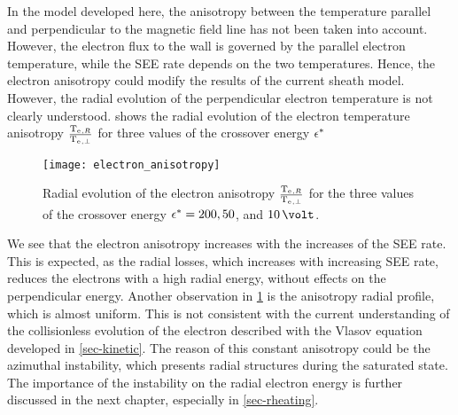 \vspace{1ex}
In the model developed here, the anisotropy between the temperature parallel and perpendicular to the magnetic field line has not been taken into account.
However, the electron flux to the wall is governed by the parallel electron temperature, while the \ac{SEE} rate depends on the two temperatures.
Hence, the electron anisotropy could modify the results of the current sheath model.
However, the radial evolution of the perpendicular electron temperature is not clearly understood.
 shows the radial evolution of the electron temperature anisotropy  $\frac{\mathrm{T_e}{}_{, R}}{\mathrm{T_e}{}_{, \perp}}$ for three values of the crossover energy $\epsilon^{*}$

\begin{figure}[!ht]
  \centering
  \texttt{[image: electron\_anisotropy]}
  \caption{Radial evolution of the electron anisotropy $\frac{\mathrm{T_e}{}_{, R}}{\mathrm{T_e}{}_{, \perp}}$ for the three values of the crossover energy $\epsilon^{*}=200, 50$, and $10\,\volt$.}
  \label{fig-anisotropy}
\end{figure}

We see that the electron anisotropy increases with the increases of the \ac{SEE} rate.
This is expected, as the radial losses, which increases with increasing \ac{SEE} rate, reduces the electrons with a high radial energy, without effects on the perpendicular energy.
Another observation in \cref{fig-anisotropy} is the anisotropy radial profile, which is almost uniform.
This is not consistent with the current understanding of the collisionless evolution of the electron described with the Vlasov equation developed in \cref{sec-kinetic}.
The reason of this constant anisotropy could be the azimuthal instability, which presents radial structures during the saturated state.
The importance of the instability on the radial electron energy is further discussed in the next chapter, especially in \cref{sec-rheating}.





